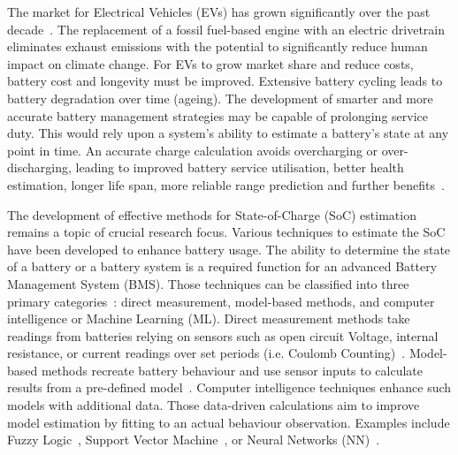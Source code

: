  {
    The market for Electrical Vehicles (EVs) has grown significantly over the past decade~\cite{state-ev-australia}.
    The replacement of a fossil fuel-based engine with an electric drivetrain eliminates exhaust emissions with the potential to significantly reduce human impact on climate change.
    For EVs to grow market share and reduce costs, battery cost and longevity must be improved.
    Extensive battery cycling leads to battery degradation over time (ageing).
    The development of smarter and more accurate battery management strategies may be capable of prolonging service duty.
    This would rely upon a system's ability to estimate a battery's state at any point in time.
    An accurate charge calculation avoids overcharging or over-discharging, leading to improved battery service utilisation, better health estimation, longer life span, more reliable range prediction and further benefits~\cite{calif_proper_2008}.
}

%
The development of effective methods for State-of-Charge (SoC) estimation remains a topic of crucial research focus.
Various techniques to estimate the SoC have been developed to enhance battery usage.
The ability to determine the state of a battery or a battery system is a required function for an advanced Battery Management System (BMS).
Those techniques can be classified into three primary categories~\cite{ali_towards_2019,ng_enhanced_2009,robust_SoC,6953745}: direct measurement, model-based methods, and computer intelligence or Machine Learning (ML).
Direct measurement methods take readings from batteries relying on sensors such as open circuit Voltage, internal resistance, or current readings over set periods (i.e. Coulomb Counting)~\cite{ng_enhanced_2009,robust_SoC}.
Model-based methods recreate battery behaviour and use sensor inputs to calculate results from a pre-defined model~\cite{6953745}.
Computer intelligence techniques enhance such models with additional data.
Those data-driven calculations aim to improve model estimation by fitting to an actual behaviour observation.
Examples include Fuzzy Logic~\cite{malkhandi_fuzzy_2006}, Support Vector Machine~\cite{hansen_support_2005, anton_battery_2013}, or Neural Networks (NN)~\cite{song_lithium-ion_2018,Chemali2017,mamo_long_2020,jiao_gru-rnn_2020,xiao_accurate_2019,javid_adaptive_2020,zhang_deep_2020}.

